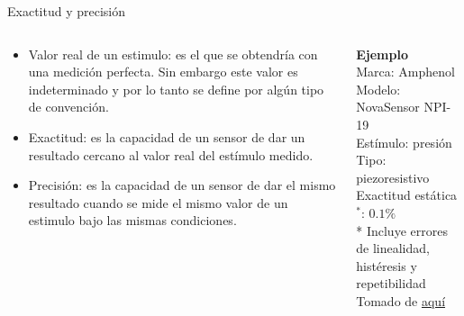\documentclass[aspectratio=169]{beamer}
\begin{document}
\begin{frame}{Exactitud y precisión}
    \begin{columns}[c, onlytextwidth]
        \begin{column}{0.55\textwidth}
            \begin{itemize}
                \item Valor real de un estimulo: es el que se obtendría con una medición perfecta. Sin embargo este valor es indeterminado y por lo tanto se define por algún tipo de convención. 
                \item Exactitud: es la capacidad de un sensor de dar un resultado cercano al valor real del estímulo medido.
                \item Precisión: es la capacidad de un sensor de dar el mismo resultado cuando se mide el mismo valor de un estimulo bajo las mismas condiciones. 
            \end{itemize}
        \end{column}
        \begin{column}{0.40\textwidth}
            \textbf{Ejemplo}\\[4pt]
            Marca: Amphenol\\[4pt]
            Modelo: NovaSensor NPI-19\\[4pt]
            Estímulo: presión\\[4pt]
            Tipo: piezoresistivo\\[4pt]
            Exactitud estática$^*$: $0.1 \%$ \\[10pt]
            \tiny{* Incluye errores de linealidad, histéresis y repetibilidad}\\
            \tiny{Tomado de \href{https://f.hubspotusercontent40.net/hubfs/9035299/Documents/AAS-920-298B-NovaSensor\%20NPI-19-REVISED-061714-web.pdf}{aquí}}
        \end{column}
    \end{columns}
\end{frame}
\end{document}
